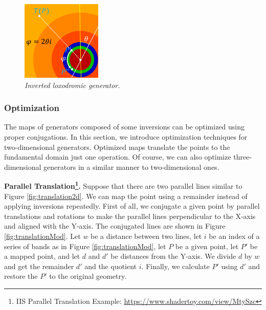 \begin{figure}[h!tbp]
\begin{minipage}[t]{0.24\hsize}
   \label{fig:loxodromicMod}
 \end{minipage}
  \hspace*{\fill}
 \begin{minipage}[t]{0.24\hsize}
   \begin{center}
    \includegraphics[width=1.5in, height=1.5in, keepaspectratio]{./img/application/optimization/loxodromicModRotation.pdf}
   \end{center}
   \caption{\textit{Inverted loxodromic generator.}}
   \label{fig:loxodromicRotationMod}
  \hspace*{\fill}
 \end{minipage}
\end{figure}


\subsubsection{Optimization}

 The maps of generators composed of some inversions
 can be optimized using proper conjugations.
 In this section, we introduce optimization techniques for two-dimensional
 generators.
 Optimized maps translate the points to the fundamental domain just one operation.
 Of course, we can also optimize three-dimensional generators in a similar manner to
 two-dimensional ones.

 \noindent\textbf{Parallel Translation\footnote{IIS Parallel Translation Example: \url{https://www.shadertoy.com/view/MtySzc}}.}
 Suppose that there are two parallel lines similar to Figure
 \ref{fig:translation2d}.
 We can map the point using a remainder instead of applying inversions
 repeatedly.
 First of all, we conjugate a given point by parallel translations and rotations to make the
 parallel lines perpendicular to the X-axis and aligned with the Y-axis.
 The conjugated lines are shown in Figure \ref{fig:translationMod}.
 Let $w$ be a distance between two lines, let $i$ be an index of a series
 of bands as in Figure \ref{fig:translationMod}, let $P$ be a given point, let
 $P'$ be a mapped point, and let $d$ and $d'$ be distances from the Y-axis.
 We divide $d$ by $w$ and get the remainder $d'$ and the
 quotient $i$.
 Finally, we calculate $P'$ using $d'$ and restore the $P'$ to the
 original geometry.

